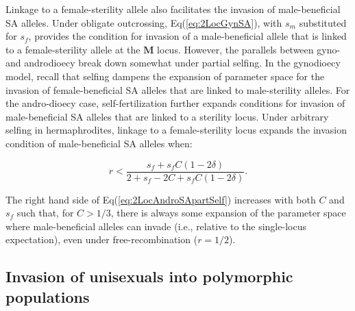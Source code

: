 \documentclass{article}
\begin{document}
Linkage to a female-sterility allele also facilitates the invasion of male-beneficial SA alleles. Under obligate outcrossing, Eq(\ref{eq:2LocGynSA}), with $s_m$ substituted for $s_f$, provides the condition for invasion of a male-beneficial allele that is linked to a female-sterility allele at the $\mathbf{M}$ locus. However, the parallels between gyno- and androdioecy break down somewhat under partial selfing. In the gynodioecy model, recall that selfing dampens the expansion of parameter space for the invasion of female-beneficial SA alleles that are linked to male-sterility alleles. For the andro-dioecy case, self-fertilization further expands conditions for invasion of male-beneficial SA alleles that are linked to a sterility locus. Under arbitrary selfing in hermaphrodites, linkage to a female-sterility locus expands the invasion condition of male-beneficial SA alleles when:

\begin{equation}\label{eq:2LocAndroSApartSelf}
	r < \frac{s_f + s_f C (1 - 2 \delta)}{2 + s_f - 2 C + s_f C (1 - 2 \delta)}.
\end{equation}

\noindent The right hand side of Eq(\ref{eq:2LocAndroSApartSelf}) increases with both $C$ and $s_f$ such that, for $C > 1/3$, there is always some expansion of the parameter space where male-beneficial alleles can invade (i.e., relative to the single-locus expectation), even under free-recombination ($r = 1/2$). 



\subsection*{Invasion of unisexuals into polymorphic populations}
\end{document}
